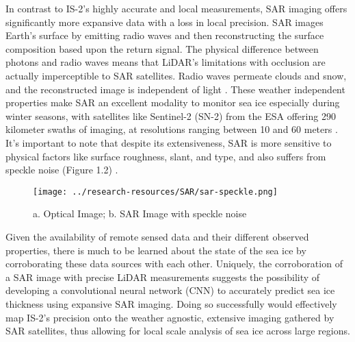 In contrast to IS-2's highly accurate and local measurements, SAR imaging offers significantly more expansive data with a loss in local precision. SAR images Earth's surface by emitting radio waves and then reconstructing the surface composition based upon the return signal. The physical difference between photons and radio waves means that LiDAR's limitations with occlusion are actually imperceptible to SAR satellites. Radio waves permeate clouds and snow, and the reconstructed image is independent of light \cite{SAR-Info}. These weather independent properties make SAR an excellent modality to monitor sea ice especially during winter seasons, with satellites like Sentinel-2 (SN-2) from the ESA offering 290 kilometer swaths of imaging, at resolutions ranging between 10 and 60 meters \cite{Sentinel-2-Availability}. It's important to note that despite its extensiveness, SAR is more sensitive to physical factors like surface roughness, slant, and type, and also suffers from speckle noise (Figure 1.2) \cite{SAR-Info}. 

\begin{figure}[h]
	\centering
	\texttt{[image: ../research-resources/SAR/sar-speckle.png]}
	\caption[SAR Speckle Noise]{a. Optical Image; b. SAR Image with speckle noise}
\end{figure}

\indent Given the availability of remote sensed data and their different observed properties, there is much to be learned about the state of the sea ice by corroborating these data sources with each other. Uniquely, the corroboration of a SAR image with precise LiDAR measurements suggests the possibility of developing a convolutional neural network (CNN) to accurately predict sea ice thickness using expansive SAR imaging. Doing so successfully would effectively map IS-2's precision onto the weather agnostic, extensive imaging gathered by SAR satellites, thus allowing for local scale analysis of sea ice across large regions.


